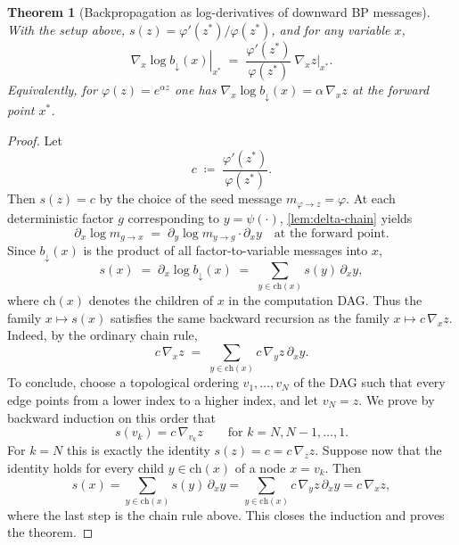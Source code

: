 \documentclass[10pt,a4paper]{amsart}
\newtheorem{theorem}{Theorem}
\newcommand{\defeq}{\coloneq}
\renewcommand{\phi}{\varphi}
\begin{document}
\begin{theorem}[Backpropagation as log-derivatives of downward BP messages]
\label{thm:caseA}
With the setup above, $s(z)=\phi'(z^*)/\phi(z^*)$, and for any variable $x$,
\[
\left.\nabla_x \log b_\downarrow(x)\right|_{x^*}
\;=\;
\frac{\phi'(z^*)}{\phi(z^*)}\ \left.\nabla_x z\right|_{x^*}.
\]
Equivalently, for $\phi(z)=e^{\alpha z}$ one has
$\nabla_x \log b_\downarrow(x)=\alpha\,\nabla_x z$ at the forward point $x^*$.
\end{theorem}

\begin{proof}
Let
\[
c\;\defeq\;\frac{\phi'(z^*)}{\phi(z^*)}.
\]
Then $s(z)=c$ by the choice of the seed message $m_{\phi\to z}=\phi$. At each deterministic factor $g$ corresponding to $y=\psi(\cdot)$,
\cref{lem:delta-chain} yields
\[
\partial_x\log m_{g\to x}
\;=\;
\partial_y\log m_{y\to g}\cdot \partial_x y
\quad\text{at the forward point}.
\]
Since $b_\downarrow(x)$ is the product of all factor-to-variable messages into $x$,
\[
s(x)
\;=\;
\partial_x\log b_\downarrow(x)
\;=\;
\sum_{y\in \mathrm{ch}(x)} s(y)\,\partial_x y,
\]
where $\mathrm{ch}(x)$ denotes the children of $x$ in the computation DAG. Thus the family $x\mapsto s(x)$ satisfies the same backward recursion as the family $x\mapsto c\,\nabla_x z$. Indeed, by the ordinary chain rule,
\[
c\,\nabla_x z
\;=\;
\sum_{y\in\mathrm{ch}(x)} c\,\nabla_y z\,\partial_x y.
\]
To conclude, choose a topological ordering $v_1,\dots,v_N$ of the DAG such that every edge points from a lower index to a higher index, and let $v_N=z$. We prove by backward induction on this order that
\[
s(v_k)=c\,\nabla_{v_k}z\qquad\text{for }k=N,N-1,\dots,1.
\]
For $k=N$ this is exactly the identity $s(z)=c=c\,\nabla_z z$. Suppose now that the identity holds for every child $y\in\mathrm{ch}(x)$ of a node $x=v_k$. Then
\[
s(x)
=
\sum_{y\in\mathrm{ch}(x)} s(y)\,\partial_x y
=
\sum_{y\in\mathrm{ch}(x)} c\,\nabla_y z\,\partial_x y
=
c\,\nabla_x z,
\]
where the last step is the chain rule above. This closes the induction and proves the theorem.
\end{proof}
\end{document}
